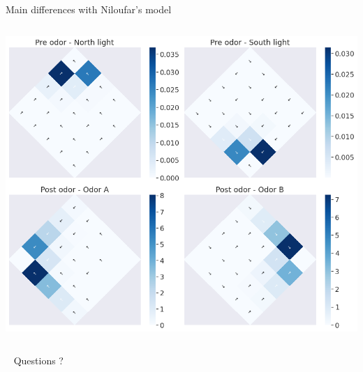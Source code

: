 \documentclass[bigger]{beamer}
\begin{document}
\begin{frame}[label={sec:orge40f702}]{Main differences with Niloufar's model}
\begin{columns}
\begin{column}{0.3\columnwidth}
\begin{center}
\includegraphics[width=\textwidth]{img/q-learning_allo_best_actions_maps.png}
\end{center}
\end{column}
\end{columns}
\end{frame}
\begin{frame}[label={sec:org62af5db},standout]{~}
Questions ?
\end{frame}
\end{document}
